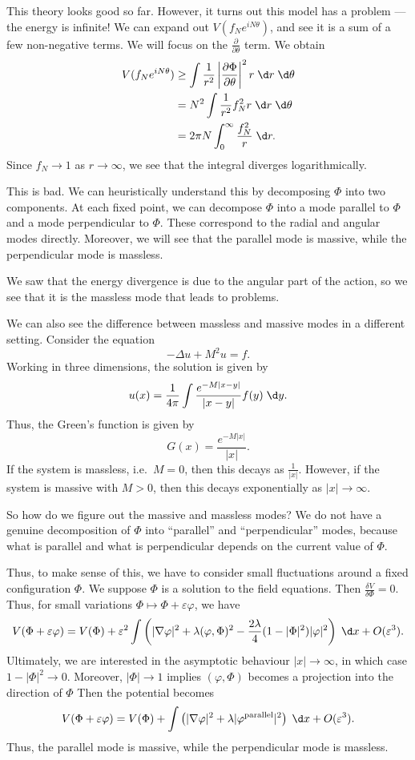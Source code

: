 \documentclass[a4paper]{article}
\begin{document}
This theory looks good so far. However, it turns out this model has a problem --- the energy is infinite! We can expand out $V(f_N e^{iN \theta})$, and see it is a sum of a few non-negative terms. We will focus on the $\frac{\partial}{\partial \theta}$ term. We obtain
\begin{align*}
  V(f_N e^{iN\theta}) &\geq \int \frac{1}{r^2} \left|\frac{\partial \Phi}{\partial \theta}\right|^2 r\;\d r\;\d \theta\\
  &= N^2 \int \frac{1}{r^2} f_N^2 r\;\d r\;\d \theta \\
  &= 2\pi N \int_0^\infty \frac{f_N^2}{r}\;\d r.
\end{align*}
Since $f_N \to 1$ as $r \to \infty$, we see that the integral diverges logarithmically.

This is bad. We can heuristically understand this by decomposing $\Phi$ into two components. At each fixed point, we can decompose $\Phi$ into a mode parallel to $\Phi$ and a mode perpendicular to $\Phi$. These correspond to the radial and angular modes directly. Moreover, we will see that the parallel mode is massive, while the perpendicular mode is massless.

We saw that the energy divergence is due to the angular part of the action, so we see that it is the massless mode that leads to problems.

We can also see the difference between massless and massive modes in a different setting. Consider the equation
\[
  -\Delta u + M^2 u = f.
\]
Working in three dimensions, the solution is given by
\[
  u(x) = \frac{1}{4\pi} \int \frac{e^{-M|x - y|}}{|x - y|} f(y)\;\d y.
\]
Thus, the Green's function is given by
\[
  G(x) = \frac{e^{-M|x|}}{|x|}.
\]
If the system is massless, i.e.\ $M = 0$, then this decays as $\frac{1}{|x|}$. However, if the system is massive with $M > 0$, then this decays exponentially as $|x| \to \infty$.

So how do we figure out the massive and massless modes? We do not have a genuine decomposition of $\Phi$ into ``parallel'' and ``perpendicular'' modes, because what is parallel and what is perpendicular depends on the current value of $\Phi$.

Thus, to make sense of this, we have to consider small fluctuations around a fixed configuration $\Phi$. We suppose $\Phi$ is a solution to the field equations. Then $\frac{\delta V}{\delta \Phi} = 0$. Thus, for small variations $\Phi \mapsto \Phi + \varepsilon \varphi$, we have
\[
  V(\Phi + \varepsilon \varphi) = V(\Phi) + \varepsilon^2 \int \left(|\nabla \varphi|^2 + \lambda (\varphi, \Phi)^2 - \frac{2\lambda}{4}(1 - |\Phi|^2)|\varphi|^2\right) \;\d x + O(\varepsilon^3).
\]
Ultimately, we are interested in the asymptotic behaviour $|x| \to \infty$, in which case $1 - |\Phi|^2 \to 0$. Moreover, $|\Phi| \to 1$ implies $(\varphi, \Phi)$ becomes a projection into the direction of $\Phi$ Then the potential becomes
\[
  V(\Phi + \varepsilon \varphi) = V(\Phi) + \int \left(|\nabla \varphi|^2 + \lambda |\varphi^{\mathrm{parallel}}|^2\right)\;\d x + O(\varepsilon^3).
\]
Thus, the parallel mode is massive, while the perpendicular mode is massless.
\end{document}
